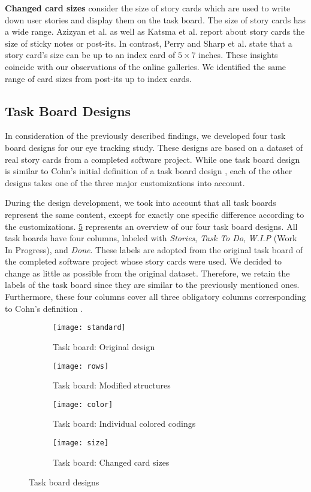 \documentclass{llncs}
\begin{document}
\textbf{Changed card sizes} consider the size of story cards which are used to write down user stories and display them on the task board.
The size of story cards has a wide range. Azizyan et al. \cite{Azizyan.2011} as 
well as Katsma et al. \cite{Katsma.2013} report about story cards the size of 
sticky notes or post-its. In contrast, Perry \cite{Perry.2008} and Sharp et al. 
\cite{Sharp.2009} state that a story card's size can be up to an index card of 
$5 \times 7$ inches.
These insights coincide with our observations of the online galleries. We identified the same range of card sizes from post-its up to index cards.

\subsection{Task Board Designs}
In consideration of the previously described findings, we developed four task 
board designs for our eye tracking study. These designs are based on a dataset 
of real story cards from a completed software project. While one task board 
design is similar to Cohn's initial definition of a task board design 
\cite{Cohn.2012}, each of the other designs takes one of the three major 
customizations into account.

During the design development, we took into account that all task boards 
represent the same content, except for exactly one specific difference 
according to the customizations. \figurename{ \ref{fig:fig}} represents an 
overview of our four task board designs. All task boards have four columns, 
labeled with \textit{Stories}, \textit{Task To Do}, \textit{W.I.P} (Work In 
Progress), and \textit{Done}. These labels are adopted from the original task 
board of the completed software project whose story cards were used. We decided 
to change as little as possible from the original dataset. Therefore, we retain 
the labels of the task board since they are similar to the previously mentioned 
ones. Furthermore, these four columns cover all three obligatory columns 
corresponding to Cohn's definition \cite{Cohn.2012}.

\begin{figure}[!b]
	\begin{subfigure}{.5\textwidth}
		\centering
		\texttt{[image: standard]}
		\caption{Task board: Original design}
		\label{fig:sfig1}
	\end{subfigure}
	\begin{subfigure}{.5\textwidth}
		\centering
		\texttt{[image: rows]}
		\caption{Task board: Modified structures}
		\label{fig:sfig2}
	\end{subfigure}
	\begin{subfigure}{.5\textwidth}
		\centering
		\texttt{[image: color]}
		\caption{Task board: Individual colored codings}
		\label{fig:sfig3}
	\end{subfigure}
	\begin{subfigure}{.5\textwidth}
		\centering
		\texttt{[image: size]}
		\caption{Task board: Changed card sizes}
		\label{fig:sfig4}
	\end{subfigure}
	\caption{Task board designs}
	\label{fig:fig}
\end{figure}
\end{document}
